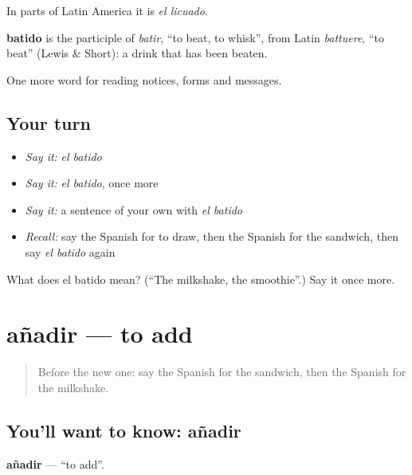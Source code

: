In parts of Latin America it is \emph{el licuado}.

\begin{cousinweb}
\textbf{batido} is the participle of \emph{batir}, \textquotedblleft{}to beat, to whisk\textquotedblright{}, from Latin \emph{battuere}, \textquotedblleft{}to beat\textquotedblright{} (Lewis \& Short): a drink that has been beaten.
\end{cousinweb}

\begin{grammarlens}[title={What you've built}]
One more word for reading notices, forms and messages.
\end{grammarlens}

\subsection*{Your turn}
\begin{itemize}
\raggedright
  \item \emph{Say it:} \emph{el batido}
  \item \emph{Say it:} \emph{el batido}, once more
  \item \emph{Say it:} a sentence of your own with \emph{el batido}
  \item \emph{Recall:} say the Spanish for to draw, then the Spanish for the sandwich, then say \emph{el batido} again
\end{itemize}

\begin{tcolorbox}[breakable,colback=teal!4,colframe=teal!35!black,title={Before you move on}]
What does el batido mean? (\textquotedblleft{}The milkshake, the smoothie\textquotedblright{}.) Say it once more.
\end{tcolorbox}
\section[añadir]{añadir — to add}

\label{lesson:ES-C499-anadir}



\begin{quote}
Before the new one: say the Spanish for the sandwich, then the Spanish for the milkshake.
\end{quote}

\subsection*{You'll want to know: añadir}
\textbf{añadir} — \textquotedblleft{}to add\textquotedblright{}.

